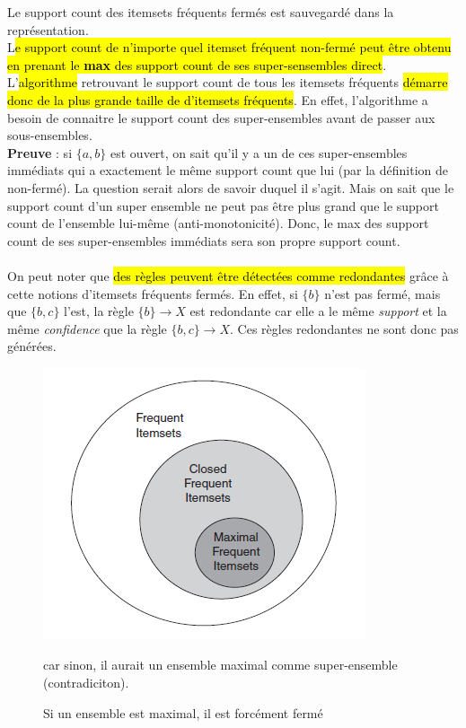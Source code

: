 \documentclass[letterpaper, 12pt]{article}
\newcommand{\alinea}{
\hspace*{0.5cm}}
\begin{document}
			\alinea Le support count des itemsets fréquents fermés 
				est sauvegardé dans la représentation.\\
			\alinea L\hl{e support count de n'importe quel itemset fréquent
				non-fermé peut être obtenu en prenant le \textbf{max} 
				des support count de ses super-sensembles direct}. 
				L'\hl{algorithme} retrouvant le support count de tous les
				itemsets fréquents \hl{démarre donc de la plus grande taille 
				de d'itemsets fréquents}. En effet, l'algorithme a besoin
				de connaitre le support count des super-ensembles avant
				de passer aux sous-ensembles.\\
			\textbf{Preuve} : si $\{a, b\}$ est ouvert, on sait qu'il y
				a un de ces super-ensembles immédiats qui a exactement
				le même support count que lui (par la définition de non-fermé). 
				La question serait alors de savoir duquel il s'agit. Mais
				on sait que le support count d'un super ensemble ne peut 
				pas être plus grand que le support count de l'ensemble 
				lui-même (anti-monotonicité). Donc, le max des support count
				de ses super-ensembles immédiats sera son propre support count.
				\\			
			~\\
			\alinea On peut noter que \hl{des règles peuvent être 
				détectées comme
				redondantes} grâce à cette notions d'itemsets fréquents fermés.
				En effet, si $\{b\}$ n'est pas fermé, mais que $\{b, c\}$
				l'est, la règle $\{b\} \longrightarrow X$ est redondante
				car elle a le même \textit{support} et la même
				\textit{confidence} que la règle $\{b, c\} \longrightarrow X$.
				Ces règles redondantes ne sont donc pas générées.
			\begin{figure}[H]
				\centering
				\includegraphics[scale=1.0]{Images/sets}
				\caption{Si un ensemble est maximal, il est forcément fermé}
				car sinon, il aurait un ensemble maximal comme super-ensemble
				(contradiciton).
				\label{fig:sets}
			\end{figure}\noindent
	\newpage
\end{document}
